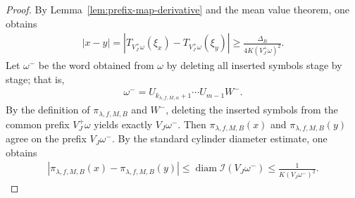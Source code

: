 \documentclass[12pt,reqno]{amsart}
\theoremstyle{definition}
\theoremstyle{plain}
\begin{document}
\begin{proof}
By Lemma~\ref{lem:prefix-map-derivative} and the mean value theorem, one obtains
\begin{align}
\label{eq:x-y-lower-local-holder-revised}
    \left|x-y\right|
    =
    \left|T_{V^+_J\omega}(\xi_x)-T_{V^+_J\omega}(\xi_y)\right|
    \ge
    \frac{\Delta_B}{4K(V^+_J\omega)^2}.
\end{align}
Let $\omega^-$ be the word obtained from $\omega$ by deleting all
inserted symbols stage by stage; that is,
\begin{align*}
    \omega^-=U_{k_{\lambda,f,M,\alpha}+1}\cdots U_{m-1}W^-.
\end{align*}
By the definition of $\pi_{\lambda,f,M,B}$ and $W^-$, deleting the inserted symbols from the common prefix $V_J^+\omega$ yields exactly $V_J\omega^-$. Then $\pi_{\lambda,f,M,B}(x)$ and $\pi_{\lambda,f,M,B}(y)$ agree on the prefix $V_J\omega^-$. By the standard cylinder diameter estimate, one obtains 
\begin{align}
\label{eq:pi-x-y-upper-local-holder-revised}
    \left|\pi_{\lambda,f,M,B}(x)-\pi_{\lambda,f,M,B}(y)\right|
    \leq \operatorname{diam}{\mathcal{I}\!\left(V_J\omega^-\right)}
    \leq \frac{1}{K(V_J\omega^-)^2}.
\end{align}


\end{proof}
\end{document}
